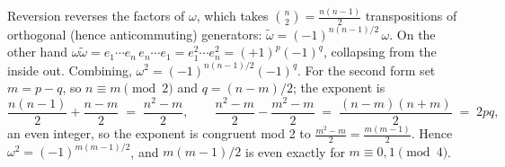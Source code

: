 Reversion reverses the factors of $\omega$, which takes $\binom{n}{2} = \tfrac{n(n-1)}{2}$ transpositions of orthogonal (hence anticommuting) generators: $\tilde{\omega} = (-1)^{n(n-1)/2}\,\omega$. On the other hand $\omega \tilde{\omega} = e_1 \cdots e_n\, e_n \cdots e_1 = e_1^2 \cdots e_n^2 = (+1)^p(-1)^q$, collapsing from the inside out. Combining, $\omega^2 = (-1)^{n(n-1)/2}(-1)^q$. For the second form set $m = p - q$, so $n \equiv m \pmod 2$ and $q = (n-m)/2$; the exponent is
\[
\frac{n(n-1)}{2} + \frac{n-m}{2} \;=\; \frac{n^2 - m}{2},
\qquad
\frac{n^2 - m}{2} - \frac{m^2 - m}{2} \;=\; \frac{(n-m)(n+m)}{2} \;=\; 2pq,
\]
an even integer, so the exponent is congruent mod 2 to $\tfrac{m^2 - m}{2} = \tfrac{m(m-1)}{2}$. Hence $\omega^2 = (-1)^{m(m-1)/2}$, and $m(m-1)/2$ is even exactly for $m \equiv 0, 1 \pmod 4$.

